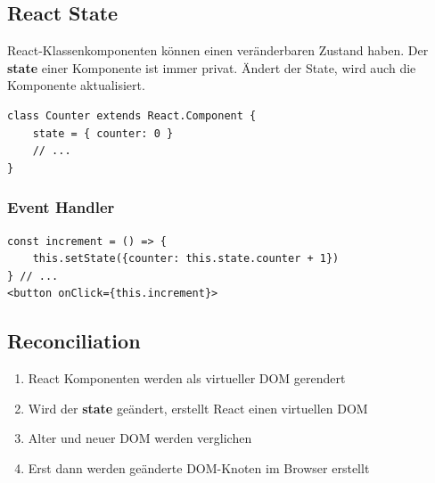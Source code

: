 \subsection{React State}
React-Klassenkomponenten können einen veränderbaren Zustand haben.
Der \textbf{state} einer Komponente ist immer privat.
Ändert der State, wird auch die Komponente aktualisiert.
\begin{lstlisting}
class Counter extends React.Component {
    state = { counter: 0 }
    // ...
}
\end{lstlisting}

\subsubsection{Event Handler}
\begin{lstlisting}
const increment = () => {
    this.setState({counter: this.state.counter + 1})
} // ...
<button onClick={this.increment}>
\end{lstlisting}

\subsection{Reconciliation}
\begin{enumerate}
    \item React Komponenten werden als virtueller DOM gerendert
    \item Wird der \textbf{state} geändert, erstellt React einen virtuellen DOM
    \item Alter und neuer DOM werden verglichen
    \item Erst dann werden geänderte DOM-Knoten im Browser erstellt
\end{enumerate}